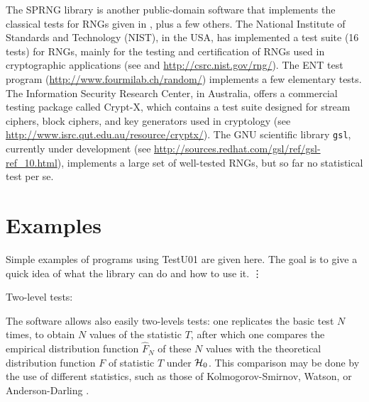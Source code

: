 The SPRNG library \cite{rMAS00a} is another public-domain software
that implements the classical tests for RNGs given
in \cite{rKNU98a}, plus a few others.
%
The National Institute of Standards and Technology (NIST), in the USA,
%
has implemented a test suite (16 tests) for RNGs, mainly for the
testing and certification of RNGs used in cryptographic applications
(see \cite{rSOT99a} and \url{http://csrc.nist.gov/rng/}).
The ENT test program (\url{http://www.fourmilab.ch/random/})
%
implements a few elementary tests.
The Information Security Research Center, in Australia,
offers a commercial testing package called Crypt-X, 
%
which contains a test suite designed for stream
ciphers, block ciphers, and key generators used in cryptology
(see \url{http://www.isrc.qut.edu.au/resource/cryptx/}).
The GNU scientific library {\tt gsl}, currently under development
(see \url{http://sources.redhat.com/gsl/ref/gsl-ref_10.html}),
implements a large set of well-tested RNGs, but so far no statistical
test per se.

\iffalse  %

\section {Examples}

Simple examples of programs using {TestU01} are given here.
The goal is to give a quick idea of what the library can do and how
to use it.  
  \vdots



Two-level tests:

The software allows also easily two-levels tests:
one replicates the basic test $N$ times, to obtain $N$
values of the statistic $T$, after which one compares the empirical
distribution function $\hat F_N$ of these $N$ values with the
theoretical distribution function $F$ of statistic $T$ under $\mathcal{H}_0$.
This comparison may be done by the use of  different statistics, 
such as those of Kolmogorov-Smirnov, Watson, or Anderson-Darling
\cite{tDAR60a,tDUR73a,tSTE70a,tSTE86b}.

